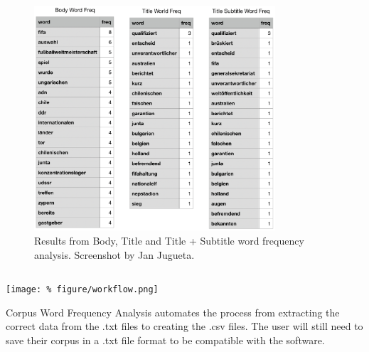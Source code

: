 \documentclass[unknownkeysallowed,usepdftitle=false,aspectratio=169, parskip=full]{beamer}
\newcommand{\secvariable}{nothing}
\newcommand{\mysection}[1]{\renewcommand{\secvariable}{#1}
}
\begin{document}
\begin{frame}
\begin{columns}[t]
\begin{column}[c]{0.45\textwidth}
\begin{figure}[h]
\includegraphics[width=0.8\textwidth,height=0.8\textheight,keepaspectratio]{figure/results.png}
\caption{Results from Body, Title and Title + Subtitle word frequency analysis. 
Screenshot by Jan Jugueta.}
\end{figure}
    \end{column}
    
  \end{columns}

  
\end{frame}

\mysection{radar}
\begin{frame}\label{\secvariable} %
\begin{center}
\texttt{[image: \%
figure/workflow.png]}
\end{center}
\vspace{-0.2cm}

Corpus Word Frequency Analysis automates the process from extracting the correct data from the .txt files to creating the .csv files. The user will still need to save their corpus in a .txt file format to be compatible with the software. 

\end{frame}
\end{document}
